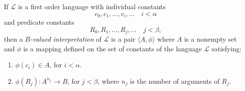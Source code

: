 If $\mathcal{L}$ is a first order language with individual constants
$$c_0, c_1, \ldots, c_i, \ldots \quad i < \alpha$$
and predicate constants
$$R_0, R_1, \ldots, R_j, \ldots \quad j < \beta,$$
then a \textit{$B$-valued interpretation} of $\mathcal{L}$ is a pair $\langle A, \phi \rangle$ where $A$ is a nonempty set and $\phi$ is a mapping defined on the set of constants of the language $\mathcal{L}$ satisfying:
\begin{enumerate}
\item $\phi(c_i) \in A$, for $i < \alpha$.
\item $\phi(R_j) \colon A^{n_j} \rightarrow B$, for $j < \beta$, where $n_j$ is the number of arguments of $R_j$.
\end{enumerate}
